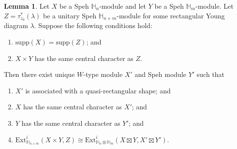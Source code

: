 \documentclass[11pt]{amsart}
\numberwithin{equation}{section}
\theoremstyle{definition}
\newtheorem{lemma}[thm]{Lemma}
\newtheorem{conjecture}[thm]{Conjecture}
\begin{document}




\begin{lemma} \label{lem decompose }
Let $X$ be a Speh $\mathbb H_n$-module and let $Y$ be a Speh $\mathbb H_m$-module. Let $Z=\tau^*_{z_0}(\lambda)$ be a unitary Speh $\mathbb H_{n+m}$-module for some rectangular Young diagram $\lambda$. Suppose the following conditions hold:
\begin{enumerate}
\item[(i)] $\mathrm{supp}(X)=\mathrm{supp}(Z)$; and
\item[(ii)] $X\times Y$ has the same central character as $Z$.
\end{enumerate}
Then there exist unique $W$-type module $X'$ and Speh module $Y'$ such that 
\begin{enumerate}
\item  $X'$ is associated with a quasi-rectangular shape; and
\item $X$ has the same central character as $X'$; and
\item $Y$ has the same central character as $Y'$; and
\item $\mathrm{Ext}^i_{\mathbb H_{n+m}}(X\times Y, Z) \cong \mathrm{Ext}^i_{\mathbb H_n\otimes \mathbb H_m}(X\boxtimes Y,  X'\boxtimes Y')$.
\end{enumerate}
\end{lemma}
\end{document}
